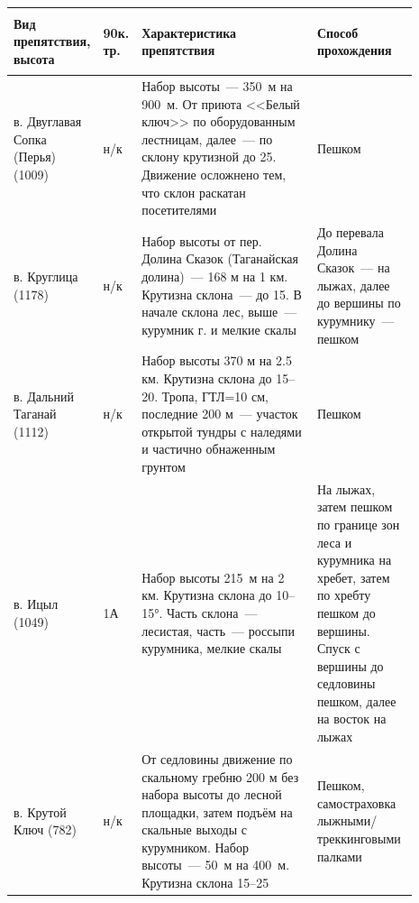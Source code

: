 \begin{table}[h!]
		\begin{tabular}{|>{\centering\arraybackslash}m{0.16\linewidth}|>{\centering\arraybackslash}m{0.03\linewidth}|>{\centering\arraybackslash}m{0.45\linewidth}|>{\centering\arraybackslash}m{0.25\linewidth}|}
			\hline
			\textbf{Вид препятствия, высота} &
			\begin{turn}{90}\textbf{к. тр.}\end{turn} &
			\textbf{Характеристика препятствия} &
			\textbf{Способ прохождения} \\
			\hline			
			в. Двуглавая Сопка (Перья) (1009) & н/к &  Набор высоты~--- 350~м на 900~м. От приюта <<Белый ключ>> по оборудованным лестницам, далее~--- по склону крутизной до 25\degree. Движение осложнено тем, что склон раскатан посетителями & Пешком\\
			\hline			
			в. Круглица	 (1178)  & н/к & Набор высоты от пер. Долина Сказок (Таганайская долина)~--- 168 м на 1 км. Крутизна
			склона~---  до 15\degree. В начале склона лес, выше~---  курумник
			г. и мелкие скалы & До перевала Долина Сказок~--- на лыжах, далее до вершины по курумнику~--- пешком \\
			\hline
			в. Дальний Таганай (1112)  & н/к & Набор
			высоты 370 м на 2.5 км. Крутизна
			склона до 15--20\degree. Тропа, ГТЛ=10 см, последние
			200 м~--- участок открытой тундры с
			наледями и частично обнаженным
			грунтом & Пешком\\
			\hline
			в. Ицыл (1049)  & 1А & Набор высоты 215~м на 2 км. Крутизна склона до 10--15°.
			Часть склона~--- лесистая, часть~--- россыпи курумника, мелкие
			скалы & На лыжах, затем пешком по границе зон леса и курумника на хребет, затем по хребту пешком
			до вершины. Спуск с вершины до седловины пешком, далее на восток на лыжах\\
			\hline
			в. Крутой Ключ (782)  & н/к & От седловины движение по скальному гребню 200 м без набора высоты до лесной площадки, затем подъём на скальные
			выходы с курумником. Набор высоты~--- 50~м на 400~м.
			Крутизна склона 15--25\degree & Пешком, самостраховка лыжными/треккинговыми палками\\

			\hline
	\end{tabular}%
\end{table}

\clearpage



